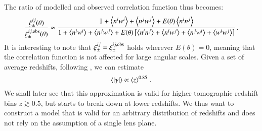 The ratio of modelled and observed correlation function thus becomes: \begin{equation}
\frac{\xi^{ij}_\pm(\theta)}{\xi_\pm^{ij,\rm{obs}}(\theta)} \approx \frac{1+\la n^iw^i\ra+\la n^jw^j\ra + E(\theta)\la n^in^j\ra}{1 + \la n^iw^i\ra + \la n^jw^j\ra + E(\theta)\left[\la n^in^j\ra + \la n^iw^j\ra + \la n^j w^i\ra + \la w^iw^j\ra\right]}
\, .
\end{equation}
It is interesting to note that $\xi^{ij}_\pm = \xi_\pm^{ij,\rm{obs}}$ holds wherever $E(\theta)=0$, meaning that the correlation function is not affected for large angular scales. Given a set of average redshifts, following \citet{2006APh....26...91V}, we can estimate 
\[
\la |\gamma| \ra \propto \la z \ra ^{0.85}\, .
\]
We shall later see that this approximation is valid for higher tomographic redshift bins $z\gtrsim 0.5$, but starts to break down at lower redshifts. We thus want to construct a model that is valid for an arbitrary distribution of redshifts and does not rely on the assumption of a single lens plane. 
